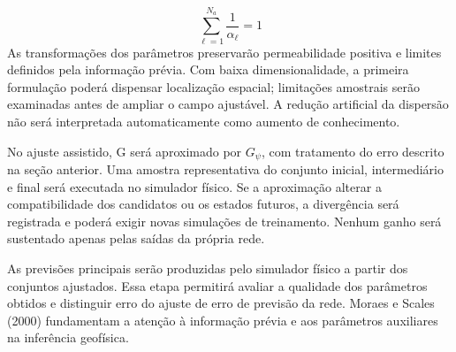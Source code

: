 \documentclass[12pt,a4paper]{article}
\begin{document}
\begin{equation}
\sum_{\ell=1}^{N_a}\frac{1}{\alpha_\ell}=1
\end{equation}
As transformações dos parâmetros preservarão permeabilidade positiva e limites definidos pela informação prévia. Com baixa dimensionalidade, a primeira formulação poderá dispensar localização espacial; limitações amostrais serão examinadas antes de ampliar o campo ajustável. A redução artificial da dispersão não será interpretada automaticamente como aumento de conhecimento.\par
No ajuste assistido, G será aproximado por \(G_{\psi}\), com tratamento do erro descrito na seção anterior. Uma amostra representativa do conjunto inicial, intermediário e final será executada no simulador físico. Se a aproximação alterar a compatibilidade dos candidatos ou os estados futuros, a divergência será registrada e poderá exigir novas simulações de treinamento. Nenhum ganho será sustentado apenas pelas saídas da própria rede.\par
As previsões principais serão produzidas pelo simulador físico a partir dos conjuntos ajustados. Essa etapa permitirá avaliar a qualidade dos parâmetros obtidos e distinguir erro do ajuste de erro de previsão da rede. Moraes e Scales (2000) fundamentam a atenção à informação prévia e aos parâmetros auxiliares na inferência geofísica.\par

\newpage
\end{document}
